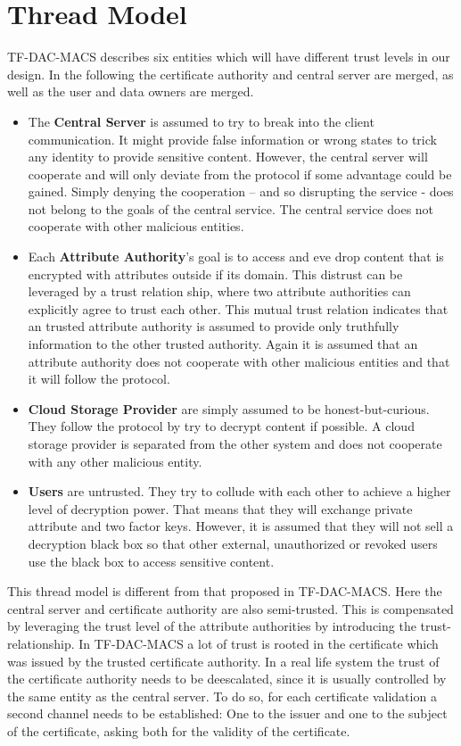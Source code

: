 \section{Thread Model}

TF-DAC-MACS describes six entities which will have different trust levels in our design. In the following the certificate authority and central server are merged, as well as the user and data owners are merged. 
\begin{itemize}
	\item The \textbf{Central Server} is assumed to try to break into the client communication. It might provide false information or wrong states to trick any identity to provide sensitive content. However, the central server will cooperate and will only deviate from the protocol if some advantage could be gained. Simply denying the cooperation – and so disrupting the service - does not belong to the goals of the central service. The central service does not cooperate with other malicious entities. 
	\item Each \textbf{Attribute Authority}’s goal is to access and eve drop content that is encrypted with attributes outside if its domain.  This distrust can be leveraged by a trust relation ship, where two attribute authorities can explicitly agree to trust each other. This mutual trust relation indicates that an trusted attribute authority is assumed to provide only truthfully information to the other trusted authority. Again it is assumed that an attribute authority does not cooperate with other malicious entities and that it will follow the protocol.
	\item \textbf{Cloud Storage Provider} are simply assumed to be honest-but-curious. They follow the protocol by try to decrypt content if possible. A cloud storage provider is separated from the other system and does not cooperate with any other malicious entity.  
	\item \textbf{Users} are untrusted. They try to collude with each other to achieve a higher level of decryption power. That means that they will exchange private attribute and two factor keys. However, it is assumed that they will not sell a decryption black box so that other external, unauthorized or revoked users use the black box to access sensitive content. 
\end{itemize}

This thread model is different from that proposed in TF-DAC-MACS. Here the central server and certificate authority are also semi-trusted. This is compensated by leveraging the trust level of the attribute authorities by introducing the trust-relationship. In TF-DAC-MACS a lot of trust is rooted in the certificate which was issued by the trusted certificate authority. In a real life system the trust of the certificate authority needs to be deescalated, since it is usually controlled by the same entity as the central server. To do so, for each certificate validation a second channel needs to be established: One to the issuer and one to the subject of the certificate, asking both for the validity of the certificate. 